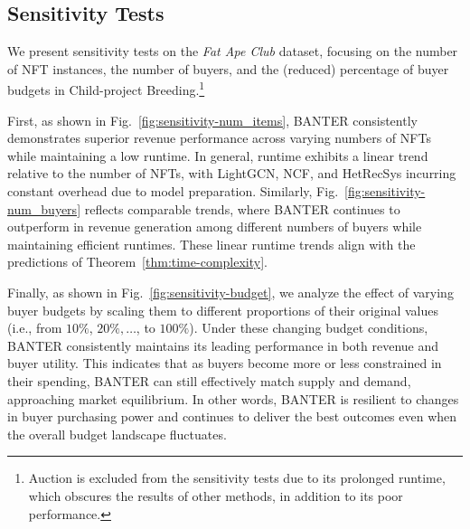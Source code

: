 \documentclass[conference]{IEEEtran}
\newcommand{\1}[1]{\mathds{1}\left[#1\right]}
\theoremstyle{plain}
\newcommand{\method}{\textsf{BANTER}\xspace}
\newcommand{\childb}{Child-project Breeding\xspace}
\begin{document}
{\subsection{Sensitivity Tests}

We present sensitivity tests on the \textit{Fat Ape Club} dataset, focusing on the number of NFT instances, the number of buyers, and the (reduced) percentage of buyer budgets in \childb.\footnote{\textsf{Auction} is excluded from the sensitivity tests due to its prolonged runtime, which obscures the results of other methods, in addition to its poor performance.} 

First, as shown in Fig.~\ref{fig:sensitivity-num_items}, \method consistently demonstrates superior revenue performance across varying numbers of NFTs while maintaining a low runtime. In general, runtime exhibits a linear trend relative to the number of NFTs, with \textsf{LightGCN}, \textsf{NCF}, and \textsf{HetRecSys} incurring constant overhead due to model preparation. Similarly, Fig.~\ref{fig:sensitivity-num_buyers} reflects comparable trends, where \method continues to outperform in revenue generation among different numbers of buyers while maintaining efficient runtimes. These linear runtime trends align with the predictions of Theorem~\ref{thm:time-complexity}. 

Finally, as shown in Fig.~\ref{fig:sensitivity-budget}, we analyze the effect of varying buyer budgets by scaling them to different proportions of their original values (i.e., from $10\%$, $20\%, \ldots$, to $100\%$). Under these changing budget conditions, \method consistently maintains its leading performance in both revenue and buyer utility. This indicates that as buyers become more or less constrained in their spending, \method can still effectively match supply and demand, approaching market equilibrium. In other words, \method is resilient to changes in buyer purchasing power and continues to deliver the best outcomes even when the overall budget landscape fluctuates.
}
\end{document}

